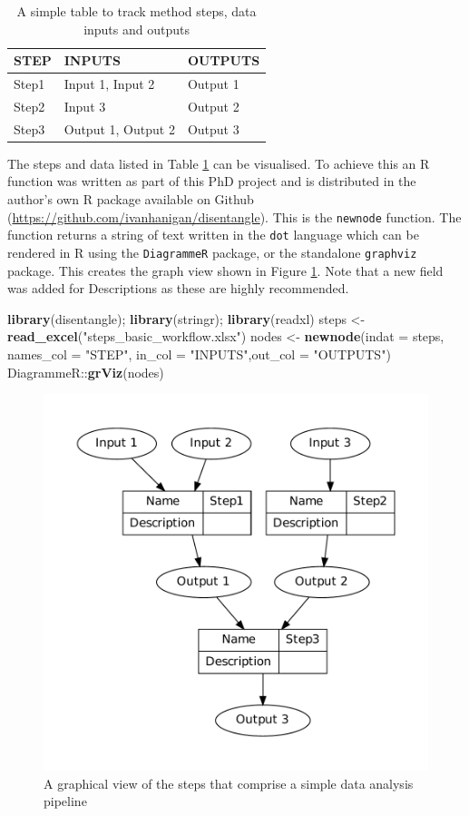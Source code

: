 \documentclass[11pt,a4paper]{article}
\newenvironment{Shaded}{\begin{snugshade}}{\end{snugshade}}
\newcommand{\KeywordTok}[1]{\textcolor[rgb]{0.13,0.29,0.53}{\textbf{{#1}}}}
\newcommand{\DataTypeTok}[1]{\textcolor[rgb]{0.13,0.29,0.53}{{#1}}}
\newcommand{\StringTok}[1]{\textcolor[rgb]{0.31,0.60,0.02}{{#1}}}
\newcommand{\NormalTok}[1]{{#1}}
\begin{document}
\begin{table}[!h]
\centering
\caption{A simple table to track method steps, data inputs and outputs} 
\label{tab:TableBasic}
\begin{tabular}{p{.6in}p{2in}p{2in}}
  \hline
STEP & INPUTS & OUTPUTS \\ 
  \hline
Step1 & Input 1, Input 2 & Output 1 \\ 
  Step2 & Input 3 & Output 2 \\ 
  Step3 & Output 1, Output 2 & Output 3 \\ 
   \hline
\end{tabular}
\end{table}

The steps and data listed in Table \ref{tab:TableBasic} can be
visualised. To achieve this an R function was written as part of this
PhD project and is distributed in the author's own R package available
on Github (\url{https://github.com/ivanhanigan/disentangle}). This is
the \texttt{newnode} function. The function returns a string of text
written in the \texttt{dot} language which can be rendered in R using
the \texttt{DiagrammeR} package, or the standalone \texttt{graphviz}
package. This creates the graph view shown in Figure \ref{fig:FigBasic}.
Note that a new field was added for Descriptions as these are highly
recommended.

\begin{Shaded}
\begin{Highlighting}[]
\KeywordTok{library}\NormalTok{(disentangle); }\KeywordTok{library}\NormalTok{(stringr); }\KeywordTok{library}\NormalTok{(readxl)}
\NormalTok{steps <-}\StringTok{ }\KeywordTok{read_excel}\NormalTok{(}\StringTok{"steps_basic_workflow.xlsx"}\NormalTok{)}
\NormalTok{nodes <-}\StringTok{ }\KeywordTok{newnode}\NormalTok{(}\DataTypeTok{indat =} \NormalTok{steps, }\DataTypeTok{names_col =} \StringTok{"STEP"}\NormalTok{,}
                 \DataTypeTok{in_col =} \StringTok{"INPUTS"}\NormalTok{,}\DataTypeTok{out_col =} \StringTok{"OUTPUTS"}\NormalTok{)}
\NormalTok{DiagrammeR::}\KeywordTok{grViz}\NormalTok{(nodes)}
\end{Highlighting}
\end{Shaded}

\begin{figure}[!ht]
\centering
\includegraphics[width=.5\textwidth]{images/fig-basic.pdf}
\caption{A graphical view of the steps that comprise a simple data analysis pipeline}
\label{fig:FigBasic}
\end{figure}

\clearpage



\end{document}
